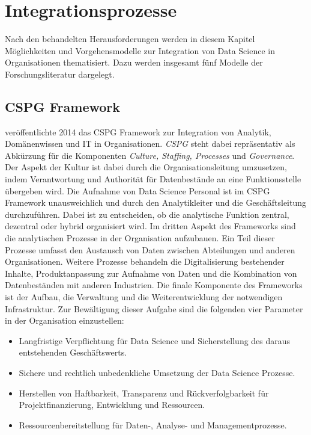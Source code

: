 \chapter[Integrationsprozesse]{Integrationsprozesse}

Nach den behandelten Herausforderungen werden in diesem Kapitel Möglichkeiten und Vorgehensmodelle zur Integration von Data Science in Organisationen thematisiert.
Dazu werden insgesamt fünf Modelle der Forschungsliteratur dargelegt.

\section{CSPG Framework}

 veröffentlichte 2014 das CSPG Framework zur Integration von Analytik, Domänenwissen und IT in Organisationen.
\textit{CSPG} steht dabei repräsentativ als Abkürzung für die Komponenten \textit{Culture, Staffing, Processes} und \textit{Governance}. 
Der Aspekt der Kultur ist dabei durch die Organisationsleitung umzusetzen, indem Verantwortung und Authorität für Datenbestände an eine Funktionsstelle übergeben wird.
Die Aufnahme von Data Science Personal ist im CSPG Framework unausweichlich und durch den Analytikleiter und die Geschäftsleitung durchzuführen. 
Dabei ist zu entscheiden, ob die analytische Funktion zentral, dezentral oder hybrid organisiert wird.
Im dritten Aspekt des Frameworks sind die analytischen Prozesse in der Organisation aufzubauen.
Ein Teil dieser Prozesse umfasst den Austausch von Daten zwischen Abteilungen und anderen Organisationen.
Weitere Prozesse behandeln die Digitalisierung bestehender Inhalte, Produktanpassung zur Aufnahme von Daten und die Kombination von Datenbeständen mit anderen Industrien.
Die finale Komponente des Frameworks ist der Aufbau, die Verwaltung und die Weiterentwicklung der notwendigen Infrastruktur.
Zur Bewältigung dieser Aufgabe sind die folgenden vier Parameter in der Organisation einzustellen:

\begin{itemize}
    \item Langfristige Verpflichtung für Data Science und Sicherstellung des daraus entstehenden Geschäftswerts.
    \item Sichere und rechtlich unbedenkliche Umsetzung der Data Science Prozesse.
    \item Herstellen von Haftbarkeit, Transparenz und Rückverfolgbarkeit für Projektfinanzierung, Entwicklung und Ressourcen.
    \item Ressourcenbereitstellung für Daten-, Analyse- und Managementprozesse.
\end{itemize}

